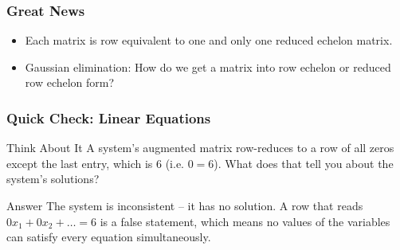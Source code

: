   \begin{frame}[fragile]\frametitle{Great News}

\begin{itemize}
 \item  Each matrix is row equivalent to one and only one reduced echelon matrix.
\item Gaussian elimination: How do we get a matrix into row echelon or reduced row echelon form?
\end{itemize}
\end{frame}

\begin{frame}[fragile]\frametitle{Quick Check: Linear Equations}
\begin{block}{Think About It}
A system's augmented matrix row-reduces to a row of all zeros except the last entry, which is $6$ (i.e. $0 = 6$). What does that tell you about the system's solutions?
\end{block}
\pause
\begin{block}{Answer}
The system is inconsistent -- it has no solution. A row that reads $0x_1 + 0x_2 + \dots = 6$ is a false statement, which means no values of the variables can satisfy every equation simultaneously.
\end{block}
\end{frame}
